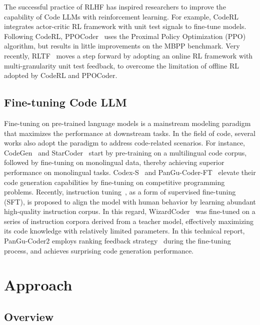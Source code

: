 \documentclass{article}
\newcommand{\pgcoder}{PanGu-Coder2\xspace}
\begin{document}
The successful practice of RLHF has inspired researchers to improve the capability of Code LLMs with reinforcement learning. For example, CodeRL~\cite{coderl} integrates actor-critic RL framework with unit test signals to fine-tune models. Following CodeRL, PPOCoder~\cite{ppocoder} uses the Proximal Policy Optimization (PPO) algorithm, but results in little improvements on the MBPP benchmark. Very recently, RLTF~\cite{rltf} moves a step forward by adopting an online RL framework with multi-granularity unit test feedback, to overcome the limitation of offline RL adopted by CodeRL and PPOCoder.


\subsection{Fine-tuning Code LLM}

Fine-tuning on pre-trained language models is a mainstream modeling paradigm that maximizes the performance at downstream tasks.
In the field of code, several works also adopt the paradigm to address code-related scenarios.
For instance, CodeGen~\cite{codegen} and StarCoder~\cite{starcoder} start by pre-training on a multilingual code corpus, followed by fine-tuning on monolingual data, thereby achieving superior performance on monolingual tasks.
Codex-S~\cite{codex} and PanGu-Coder-FT~\cite{pangu-coder} elevate their code generation capabilities by fine-tuning on competitive programming problems.
Recently, instruction tuning~\cite{instructgpt,gpt4-report}, as a form of supervised fine-tuning (SFT), is proposed to align the model with human behavior by learning abundant high-quality instruction corpus.
In this regard, WizardCoder~\cite{wizardcoder} was fine-tuned on a series of instruction corpora derived from a teacher model, effectively maximizing its code knowledge with relatively limited parameters.
In this technical report, \pgcoder employs ranking feedback strategy~\cite{rrhf} during the fine-tuning process, and achieves surprising code generation performance.

\section{Approach}
\label{sec.approach}

\subsection{Overview}
\end{document}
